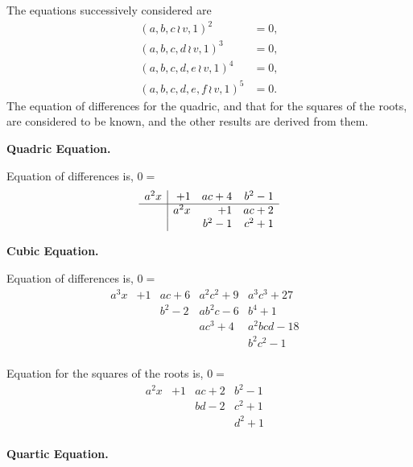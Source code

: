 \documentclass[11pt,a4paper]{book}
\begin{document}
The  equations  successively  considered  are
\begin{align*}
(a, b, c \,\!\!\wr\, v, 1)^2 &= 0, \\
(a, b, c, d \,\!\!\wr\, v, 1)^3 &= 0, \\
(a, b, c, d, e \,\!\!\wr\, v, 1)^4 &= 0, \\
(a, b, c, d, e, f \,\!\!\wr\, v, 1)^5 &= 0.
\end{align*}
The  equation  of  differences  for  the  quadric,  and  that  for  the  squares  of  the  roots,
are  considered  to  be  known,  and  the  other  results  are  derived  from  them.

\medskip
\noindent\textbf{Quadric Equation.}

\noindent
Equation  of  differences  is,  $0 =$
\[
\begin{array}{r|rrr}
a^2 x & +1 & ac + 4 & b^2 - 1 \\
\hline
& a^2 x & +1 & ac + 2 \\
& & b^2 - 1 & c^2 + 1 \\
\end{array}
\]

\medskip
\noindent\textbf{Cubic Equation.}

\noindent
Equation  of  differences  is,  $0 =$
\[
\begin{array}{r|rrrrr}
a^3 x & +1 & ac + 6 & a^2 c^2 + 9 & a^3 c^3 + 27 & \\
& & b^2 - 2 & ab^2 c - 6 & b^4 + 1 & \\
& & & ac^3 + 4 & a^2 bc d - 18 & \\
& & & & b^2 c^2 - 1 & \\
\end{array}
\]

\noindent
Equation  for  the  squares  of  the  roots  is,  $0 =$
\[
\begin{array}{r|rrrr}
a^2 x & +1 & ac + 2 & b^2 - 1 & \\
& & bd - 2 & c^2 + 1 & \\
& & & d^2 + 1 & \\
\end{array}
\]

\newpage
\noindent\textbf{Quartic Equation.}
\end{document}
